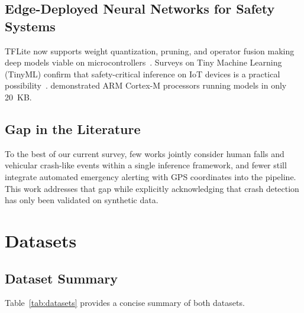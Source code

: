 \documentclass[12pt,a4paper]{article}
\begin{document}
\subsection{Edge-Deployed Neural Networks for Safety Systems}

TFLite now supports weight quantization, pruning, and operator fusion making
deep models viable on microcontrollers~\citep{tflite_micro}. Surveys on Tiny
Machine Learning (TinyML) confirm that safety-critical inference on IoT
devices is a practical possibility~\citep{tinyml2023}. \citet{david2021}
demonstrated ARM Cortex-M processors running models in only 20~KB.

\subsection{Gap in the Literature}

To the best of our current survey, few works jointly consider human falls and
vehicular crash-like events within a single inference framework, and fewer
still integrate automated emergency alerting with GPS coordinates into the
pipeline. This work addresses that gap while explicitly acknowledging that
crash detection has only been validated on synthetic data.

\section{Datasets}
\label{sec:dataset}

\subsection{Dataset Summary}

Table~\ref{tab:datasets} provides a concise summary of both datasets.
\end{document}
